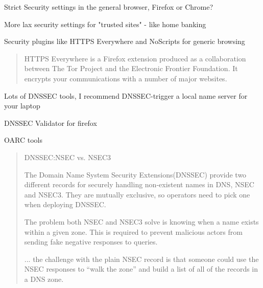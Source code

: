 \documentclass[20pt,landscape,a4paper,footrule]{foils}
\begin{document}


\begin{list2}
\item Strict Security settings in the general browser, Firefox or Chrome?
\item More lax security settings for "trusted sites" - like home banking
\item Security plugins like HTTPS Everywhere and NoScripts for generic browsing
\end{list2}


\begin{quote}
HTTPS Everywhere is a Firefox extension produced as a collaboration between The Tor Project and the Electronic Frontier Foundation. It encrypts your communications with a number of major websites.
\end{quote}

\centerline{}



Lots of DNSSEC tools, I recommend DNSSEC-trigger a local name server for your laptop

\begin{list2}
\item DNSSEC Validator for firefox\\ 
\item OARC tools 
\item {}
\end{list2}


\begin{quote}
DNSSEC:NSEC vs. NSEC3

The Domain Name System Security Extensions(DNSSEC) provide two different records for securely handling non-existent names in DNS, NSEC and NSEC3. They are mutually exclusive, so operators need to pick one when deploying DNSSEC.

The problem both NSEC and NSEC3 solve is knowing when a name exists within a given zone. This is required to prevent malicious actors from sending fake negative responses to queries.

... the challenge with the plain NSEC record is that someone could use the NSEC responses to “walk the zone” and build a list of all of the records in a DNS zone.
\end{quote}
\end{document}
